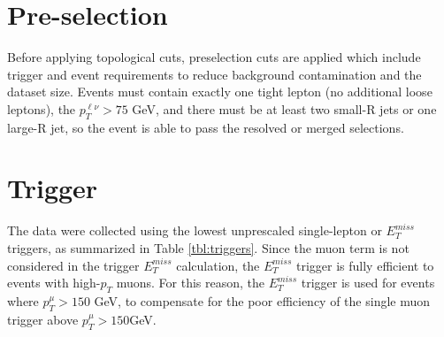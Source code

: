 \section{Pre-selection}
Before applying topological cuts, preselection cuts are applied which include trigger and event requirements to reduce background contamination and the dataset size. Events must contain exactly one tight lepton (no additional loose leptons),  the $p_{T}^{\ell \nu} > 75$ GeV, and there must be at least two small-R jets or one large-R jet, so the event is able to pass the resolved or merged selections.
\section{Trigger}
The data were collected using the lowest unprescaled single-lepton or $E_{T}^{miss}$ triggers, as summarized in Table \ref{tbl:triggers}. Since the muon term is not considered in the trigger $E_{T}^{miss}$ calculation, the $E_{T}^{miss}$ trigger is fully efficient to events with high-$p_{T}$ muons. For this reason, the $E_{T}^{miss}$  trigger is used for events where $p_{T}^{\mu} > 150$ GeV, to compensate for the poor efficiency of the single muon trigger above $p_{T}^{\mu}>150$GeV. 


